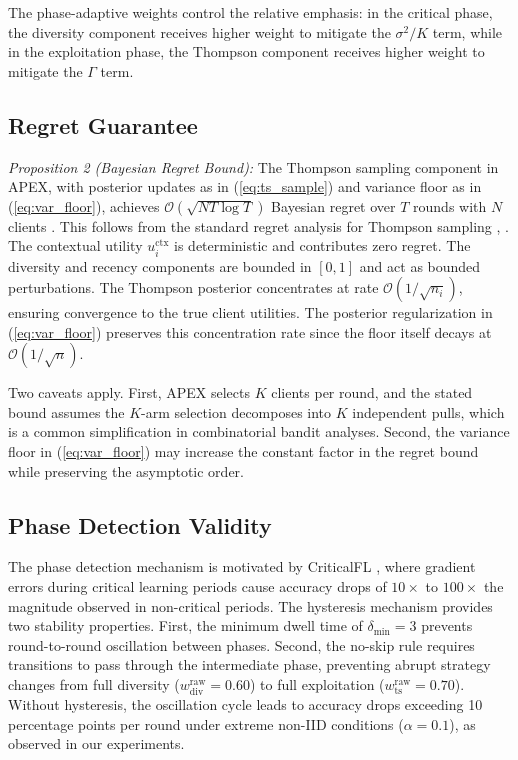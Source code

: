 \documentclass[journal]{IEEEtran}
\begin{document}
The phase-adaptive weights control the relative emphasis: in the critical phase, the diversity component receives higher weight to mitigate the $\sigma^2/K$ term, while in the exploitation phase, the Thompson component receives higher weight to mitigate the $\Gamma$ term.

\subsection{Regret Guarantee}

\textit{Proposition 2 (Bayesian Regret Bound):} The Thompson sampling component in APEX, with posterior updates as in (\ref{eq:ts_sample}) and variance floor as in (\ref{eq:var_floor}), achieves $\mathcal{O}(\sqrt{NT\log T})$ Bayesian regret over $T$ rounds with $N$ clients \cite{agrawal2012analysis}. This follows from the standard regret analysis for Thompson sampling \cite{agrawal2012analysis}, \cite{chapelle2011empirical}. The contextual utility $u_i^{\text{ctx}}$ is deterministic and contributes zero regret. The diversity and recency components are bounded in $[0, 1]$ and act as bounded perturbations. The Thompson posterior concentrates at rate $\mathcal{O}(1/\sqrt{n_i})$, ensuring convergence to the true client utilities. The posterior regularization in (\ref{eq:var_floor}) preserves this concentration rate since the floor itself decays at $\mathcal{O}(1/\sqrt{n})$.

Two caveats apply. First, APEX selects $K$ clients per round, and the stated bound assumes the $K$-arm selection decomposes into $K$ independent pulls, which is a common simplification in combinatorial bandit analyses. Second, the variance floor in (\ref{eq:var_floor}) may increase the constant factor in the regret bound while preserving the asymptotic order.

\subsection{Phase Detection Validity}

The phase detection mechanism is motivated by CriticalFL \cite{yan2023criticalfl}, where gradient errors during critical learning periods cause accuracy drops of $10\times$ to $100\times$ the magnitude observed in non-critical periods. The hysteresis mechanism provides two stability properties. First, the minimum dwell time of $\delta_{\min} = 3$ prevents round-to-round oscillation between phases. Second, the no-skip rule requires transitions to pass through the intermediate phase, preventing abrupt strategy changes from full diversity ($w_{\text{div}}^{\text{raw}} = 0.60$) to full exploitation ($w_{\text{ts}}^{\text{raw}} = 0.70$). Without hysteresis, the oscillation cycle leads to accuracy drops exceeding 10 percentage points per round under extreme non-IID conditions ($\alpha = 0.1$), as observed in our experiments.
\end{document}
